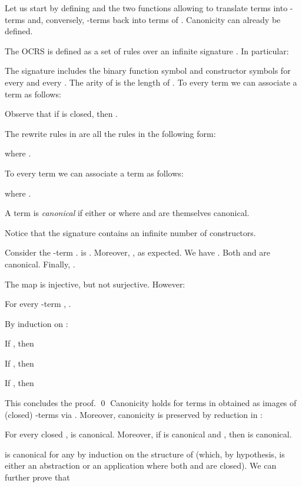 \documentclass{LMCS}
\newenvironment{varitemize}
{
\begin{list}{\labelitemi}
{\setlength{\itemsep}{0.0mm}
 \setlength{\topsep}{0.0mm}
 \setlength{\parindent}{0.0mm}
 \setlength{\parskip}{0.0mm}
 \setlength{\parsep}{0.0mm}
 \setlength{\partopsep}{0.0mm}
 \setlength{\leftmargin}{15pt}
 \setlength{\labelsep}{5pt}
 \setlength{\labelwidth}{10pt}}}
{
 \end{list} 
}
\newcounter{number}
\begin{document}
Let us start by defining  and the two functions allowing to translate terms
 into -terms and, conversely, -terms back into terms of . 
Canonicity can already be defined.
\begin{defi}
The OCRS  is defined as a set of rules  over
an infinite signature . In particular:
\begin{varitemize} 
  \item
    The signature  includes the binary function symbol  and
    constructor symbols  for every  and
    every . The arity of
     is the length of . 
    To every term  we can associate
    a term  as follows:
    
    Observe that if  is closed, then . 
  \item
    The rewrite rules in  are all the rules in the following form:
    
    where .
  \item
    To every term  we can associate
    a term  as follows:
    
    where .
  \item
    A term  is \emph{canonical} if either  or
     where  and  are
    themselves canonical.
  \end{varitemize}
\end{defi}

\noindent Notice that the signature  contains an
infinite number of constructors.
\begin{exa}
Consider the -term .
 is
.
Moreover, , 
as expected. We have . Both  and  are
canonical. Finally, .
\end{exa}
The map  is injective, but not surjective. However:
\begin{lem}\label{lemma:invert}
For every -term , .
\end{lem}
\proof
By induction on :
\begin{varitemize}
\item
  If , then 
  
\item
  If , then
  
\item
  If , then
  
\end{varitemize}
This concludes the proof.
\qed
Canonicity holds for terms in  obtained as images of (closed) 
-terms via . Moreover, canonicity
is preserved by reduction in :
\begin{lem}\label{lemma:canonicity}
For every closed ,  is canonical.
Moreover, if  is canonical and , 
then  is canonical. 
\end{lem}
\proof
 is canonical for any  by
induction on the structure of  (which, by hypothesis, is either an
abstraction or an application  where both
 and  are closed). We can further prove that
\end{document}
